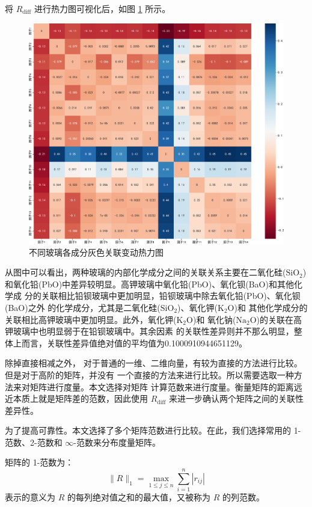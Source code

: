 \documentclass[withoutpreface,bwprint]{cumcmthesis} %
\begin{document}
将 $R_{\mathrm{diff}}$ 进行热力图可视化后，如图 \ref{fig:diff} 所示。
\begin{figure}[!htb]
    \centering
    \includegraphics[scale=0.25]{不同玻璃各成分灰色关联变动热力图.pdf}
    \caption{不同玻璃各成分灰色关联变动热力图}
    \label{fig:diff}
\end{figure}

从图中可以看出，两种玻璃的内部化学成分之间的关联关系主要在二氧化硅($\mathrm{SiO_2}$)
和氧化铅(PbO)中差异较明显。高钾玻璃中氧化铅(PbO)、氧化钡(BaO)和其他化学成
分的关联相比铅钡玻璃中更加明显，铅钡玻璃中除去氧化铅(PbO)、氧化钡(BaO)之外
的化学成分，尤其是二氧化硅($\mathrm{SiO_2}$)、氧化钾($\mathrm{K_2O}$)和
其他化学成分的关联相比高钾玻璃中更加明显。此外，氧化钾($\mathrm{K_2O}$)和
氧化钠($\mathrm{Na_2O}$)的关联在高钾玻璃中也明显弱于在铅钡玻璃中。其余因素
的关联性差异则并不那么明显，整体上而言，关联性差异值绝对值的平均值为0.1000910944651129。

除掉直接相减之外，
对于普通的一维、二维向量，有较为直接的方法进行比较。但是对于高阶的矩阵，并没有
一个直接的方法来进行比较。所以需要选取一种方法来对矩阵进行度量。本文选择对矩阵
计算范数来进行度量。衡量矩阵的距离远近本质上就是矩阵差的范数，因此使用 
$R_{\mathrm{diff}}$ 来进一步确认两个矩阵之间的关联性差异性。

为了提高可靠性。本文选择了多个矩阵范数进行比较。在此，我们选择常用的 
1-范数、2-范数和 $\infty$-范数来分布度量矩阵。

矩阵的 1-范数为：
\[
    \|R\|_1 = \max_{1\leqslant j\leqslant n}\sum_{i=1}^n|r_{ij}|
\]
\indent 表示的意义为 $R$ 的每列绝对值之和的最大值，又被称为 $R$ 的列范数。
\end{document}
